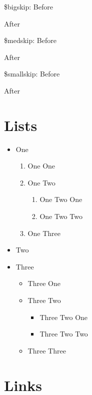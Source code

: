 \documentclass[demo]{pyscribe}
\begin{document}
\par\$bigskip: Before\par \bigskip After
\par\$medskip: Before\par \medskip After
\par\$smallskip: Before\par \medskip After

\section{Lists}

\par\begin{itemize}
\item One
\par\begin{enumerate}
\item One One
\item One Two
\par\begin{enumerate}
\item One Two One
\item One Two Two
\end{enumerate}\par
\item One Three
\end{enumerate}\par
\item Two
\item Three
\par\begin{itemize}
\item Three One
\item Three Two
\par\begin{itemize}
\item Three Two One
\item Three Two Two
\end{itemize}\par
\item Three Three
\end{itemize}\par
\end{itemize}\par

\section{Links}
\end{document}
